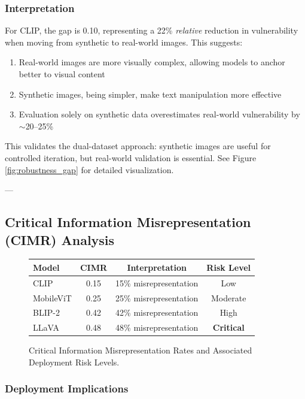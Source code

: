 \documentclass[11pt]{article}
\begin{document}
\subsubsection{Interpretation}

For CLIP, the gap is 0.10, representing a 22\% \emph{relative} reduction in vulnerability when moving from synthetic to real-world images. This suggests:

\begin{enumerate}[leftmargin=2em]
    \item Real-world images are more visually complex, allowing models to anchor better to visual content
    \item Synthetic images, being simpler, make text manipulation more effective
    \item Evaluation solely on synthetic data overestimates real-world vulnerability by $\sim$20--25\%
\end{enumerate}

This validates the dual-dataset approach: synthetic images are useful for controlled iteration, but real-world validation is essential. See Figure \ref{fig:robustness_gap} for detailed visualization.

---

\subsection{Critical Information Misrepresentation (CIMR) Analysis}

\begin{figure}[H]
\centering
\begin{tabular}{l|c|c|c}
\textbf{Model} & \textbf{CIMR} & \textbf{Interpretation} & \textbf{Risk Level} \\
\hline
CLIP & 0.15 & 15\% misrepresentation & Low \\
MobileViT & 0.25 & 25\% misrepresentation & Moderate \\
BLIP-2 & 0.42 & 42\% misrepresentation & High \\
LLaVA & 0.48 & 48\% misrepresentation & \textbf{Critical} \\
\end{tabular}
\caption*{Critical Information Misrepresentation Rates and Associated Deployment Risk Levels.}
\end{figure}

\subsubsection{Deployment Implications}
\end{document}
